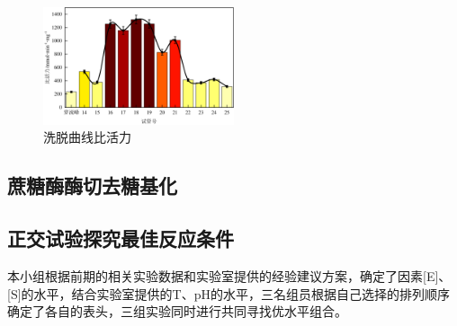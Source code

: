 \begin{figure}[H]
    \centering
    \includegraphics[width = 0.5\textwidth]{figure/1124/Activity_Curve.pdf}
    \caption{洗脱曲线比活力}
    \label{fig:Activity_Curve}
\end{figure}

\subsection{蔗糖酶酶切去糖基化}

\subsection{正交试验探究最佳反应条件}
本小组根据前期的相关实验数据和实验室提供的经验建议方案，确定了因素[E]、[S]的水平，结合实验室提供的T、pH的水平，三名组员根据自己选择的排列顺序确定了各自的表头，三组实验同时进行共同寻找优水平组合。

